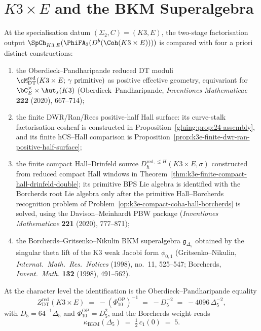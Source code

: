 \chapter{\texorpdfstring{$K3 \times E$}{K3 x E} and the BKM Superalgebra}
\label{ch:k3e-bkm}
\label{ch:k3-times-e}
\label{thm:denom-bar-euler}

\providecommand{\multEnr}{\mathrm{mult}_{\mathrm{Enr}}}
\providecommand{\multKthree}{\mathrm{mult}_{K3}}
\providecommand{\cKthree}{c_{K3}}
\providecommand{\EnrAdm}{\mathcal{A}_{\mathrm{Enr}}}
\providecommand{\EnrVirt}{\mathcal{V}_{\mathrm{Enr}}}
\providecommand{\CplusEnr}{C_+^{\mathrm{Enr}}}

\begin{theorem}
\label{thm:k3e-four-corner-structure}
At the specialisation datum $(\Sigma_2, C) = (K3, E)$, the two-stage
factorisation output $\SpCh_{K3, E}(\PhiFA_3(D^b(\Coh(K3 \times E))))$
is compared with four a priori distinct constructions:
\begin{enumerate}[label=\textup{(\roman*)}]
\item the Oberdieck--Pandharipande reduced DT moduli
 $\cM^{\mathrm{red}}_{\mathrm{DT}}(K3 \times E;\,\gamma\text{ primitive})$
 as positive effective geometry, equivariant for
 $\bC^\times_E \times \Aut_s(K3)$
 (Oberdieck--Pandharipande,
 \emph{Inventiones Mathematicae} \textbf{222} (2020), 667--714);
\item the finite DWR/Ran/Rees positive-half Hall surface: its
 curve-stalk factorisation cosheaf is constructed in
 Proposition~\ref{gluing:prop:24-assembly}, and its finite hCS--Hall
 comparison is Proposition~\ref{prop:k3e-finite-dwr-ran-positive-half-surface};
\item the finite compact Hall--Drinfeld source
 \(D^{\mathrm{red},\leq H}_{\hbar}(K3\times E,\sigma)\) constructed
 from reduced compact Hall windows in
 Theorem~\ref{thm:k3e-finite-compact-hall-drinfeld-double}; its
 primitive BPS Lie algebra is identified with the Borcherds root Lie
 algebra only after the primitive Hall--Borcherds recognition problem
 of Problem~\ref{op:k3e-compact-coha-hall-borcherds} is solved, using
 the Davison--Meinhardt PBW package
 (\emph{Inventiones Mathematicae} \textbf{221} (2020), 777--871);
\item the Borcherds--Gritsenko--Nikulin BKM superalgebra
 $\mathfrak{g}_{\Delta_5}$ obtained by the singular theta lift of the
 K3 weak Jacobi form $\phi_{0,1}$
 (Gritsenko--Nikulin, \emph{Internat.\ Math.\ Res.\ Notices} (1998),
 no.\ 11, 525--547; Borcherds, \emph{Invent.\ Math.} \textbf{132}
 (1998), 491--562).
\end{enumerate}
At the character level the identification is the Oberdieck--Pandharipande
equality
\[
 Z^{\mathrm{red}}_{\mathrm{DT}}(K3 \times E)
 \;=\;
 -(\Phi_{10}^{\mathrm{OP}})^{-1}
 \;=\;
 -D_5^{-2}
 \;=\;
 -4096\,\Delta_5^{-2},
\]
with \(D_5=64^{-1}\Delta_5\) and
\(\Phi_{10}^{\mathrm{OP}}=D_5^2\),
and the Borcherds weight reads
\[
 \kappa_{\mathrm{BKM}}(\Delta_5) \;=\; \tfrac{1}{2}\,c_1(0) \;=\; 5.
\]
\end{theorem}

